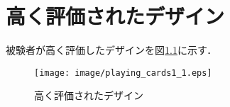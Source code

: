 \chapter{高く評価されたデザイン}
被験者が高く評価したデザインを図\ref{design1}に示す．


\begin{figure}[htbp]
    \begin{center}
        \centering
        \texttt{[image: image/playing\_cards1\_1.eps]}
        \caption{高く評価されたデザイン}
        \label{design1}
    \end{center}
\end{figure}
